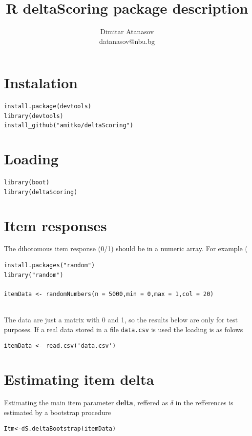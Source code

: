 \documentclass[10pt,a4paper]{article}
\begin{document}
\title{R deltaScoring package description}
\author{Dimitar Atanasov\\ datanasov@nbu.bg}

\maketitle

\section{Instalation}
\begin{lstlisting}
install.package(devtools)
library(devtools)
install_github("amitko/deltaScoring")
\end{lstlisting}

\section{Loading}
\begin{lstlisting}
library(boot)
library(deltaScoring)
\end{lstlisting}

\section{Item responses}
The dihotomous item response (0/1) should be in a numeric array. For example (
\begin{lstlisting}
install.packages("random")  
library("random")

itemData <- randomNumbers(n = 5000,min = 0,max = 1,col = 20) 
 
\end{lstlisting}

The data are just a matrix with 0 and 1, so the results below are only for test purposes. If a real data stored in a file {\tt data.csv} is used the loading is as folows
\begin{lstlisting}
itemData <- read.csv('data.csv')
\end{lstlisting}

\section{Estimating item delta}
Estimating the main item parameter {\bf delta}, reffered as $\delta$  in the refferences is estimated by a bootstrap procedure
\begin{lstlisting}
Itm<-dS.deltaBootstrap(itemData) 
\end{lstlisting}
\end{document}
